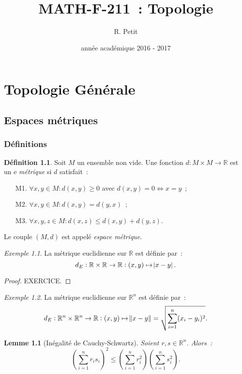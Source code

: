 \documentclass{report}
\title{MATH-F-211~: Topologie}
\author{R. Petit}
\date{année académique 2016 - 2017}
\newtheorem{lem}[thm]{Lemme}
\theoremstyle{definition}
\newtheorem{déf}[thm]{Définition}
\theoremstyle{remark}
\newtheorem{ex}{Exemple}[chapter]
\newcommand{\R}{\mathbb R}
\begin{document}
\maketitle
\tableofcontents
\newpage
\setcounter{page}{1}

\part{Topologie Générale}
\chapter{Espaces métriques}
	\section{Définitions}
		\begin{déf} Soit $M$ un ensemble non vide. Une fonction $d : M \times M \to \R$ est un e \textit{métrique} si $d$ satisfait~:
		\begin{itemize}
			\item[M1.] $\forall x, y \in M : d(x, y) \geq 0$ avec $d(x, y) = 0 \iff x = y$~;
			\item[M2.] $\forall x, y \in M : d(x, y) = d(y, x)$~;
			\item[M3.] $\forall x, y, z \in M : d(x, z) \leq d(x, y) + d(y, z)$.
		\end{itemize}

		Le couple $(M, d)$ est appelé \textit{espace métrique}.
		\end{déf}

		\begin{ex} La métrique euclidienne sur $\R$ est définie par~:
		\[d_E : \R \times \R \to \R : (x, y) \mapsto \abs {x-y}.\]
		\end{ex}

		\begin{proof} EXERCICE.
		\end{proof}

		\begin{ex}\label{ex:metriqueeuclidiennern} La métrique euclidienne sur $\R^n$ est définie par~:
		\[d_E : \R^n \times \R^n \to \R : (x, y) \mapsto \norm {x-y} = \sqrt {\sum_{i=1}^n (x_i-y_i)^2}.\]
		\end{ex}

		\begin{lem}[Inégalité de Cauchy-Schwartz] Soient $r, s \in \R^n$. Alors~:
		\[\left(\sum_{i=1}^n r_is_i\right)^2 \leq \left(\sum_{i=1}^nr_i^2\right)\left(\sum_{i=1}^ns_i^2\right).\]
		\end{lem}
\end{document}
